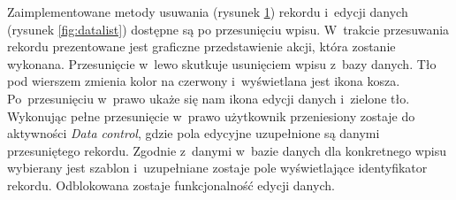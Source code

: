 \documentclass[a4paper,12pt, twoside]{article}
\begin{document}
\begin{enumerate}
\begin{figure}[H]
\begin{minipage}{.5\textwidth}
                    \label{fig:datadelete}
                \end{minipage}%
    	   \end{figure}
    	   Zaimplementowane metody usuwania (rysunek \ref{fig:datadelete}) rekordu i~edycji danych (rysunek \ref{fig:datalist}) dostępne są po przesunięciu wpisu. W~trakcie przesuwania rekordu prezentowane jest graficzne przedstawienie akcji, która zostanie wykonana. Przesunięcie w~lewo skutkuje usunięciem wpisu z~bazy danych. Tło pod wierszem zmienia kolor na czerwony i~wyświetlana jest ikona kosza. 
    	   Po~przesunięciu w~prawo ukaże się nam ikona edycji danych i~zielone tło. Wykonując pełne przesunięcie w~prawo użytkownik przeniesiony zostaje do aktywności \textit{Data control}, gdzie pola edycyjne uzupełnione są danymi przesuniętego rekordu. Zgodnie z~danymi w~bazie danych dla konkretnego wpisu wybierany jest szablon i~uzupełniane zostaje pole wyświetlające identyfikator rekordu. Odblokowana zostaje funkcjonalność edycji danych.
    	   

\end{enumerate}
\end{document}
